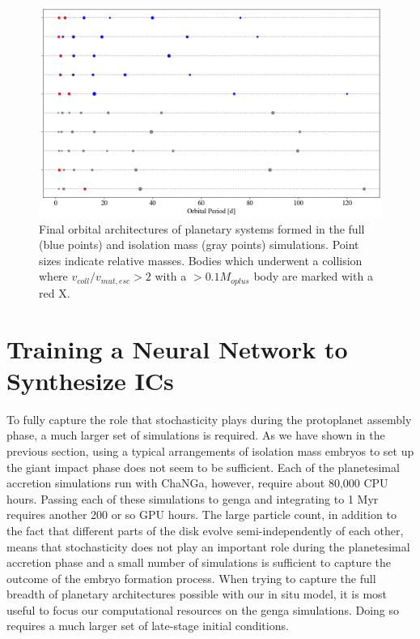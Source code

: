 \begin{figure}
\begin{center}
    \includegraphics[width=\textwidth]{figures/stip/architectures_iso_comp.png}
    \caption{Final orbital architectures of planetary systems formed in the full (blue points) and isolation mass (gray points) simulations. Point sizes indicate relative masses. Bodies which underwent a collision where $v_{coll}/v_{mut,esc} > 2$ with a $> 0.1 M_{oplus}$ body are marked with a red X.\label{fig:architectures_iso_comp}}
\end{center}
\end{figure}

\section{Training a Neural Network to Synthesize ICs} \label{sec:neuralICs}

To fully capture the role that stochasticity plays during the protoplanet assembly phase, a much larger set of simulations is required. As we have shown in the previous section, using a typical arrangements of isolation mass embryos to set up the giant impact phase does not seem to be sufficient. Each of the planetesimal accretion simulations run with {\sc ChaNGa}, however, require about 80,000 CPU hours. Passing each of these simulations to {\sc genga} and integrating to 1 Myr requires another 200 or so GPU hours. The large particle count, in addition to the fact that different parts of the disk evolve semi-independently of each other, means that stochasticity does not play an important role during the planetesimal accretion phase and a small number of simulations is sufficient to capture the outcome of the embryo formation process. When trying to capture the full breadth of planetary architectures possible with our in situ model, it is most useful to focus our computational resources on the {\sc genga} simulations. Doing so requires a much larger set of late-stage initial conditions.

